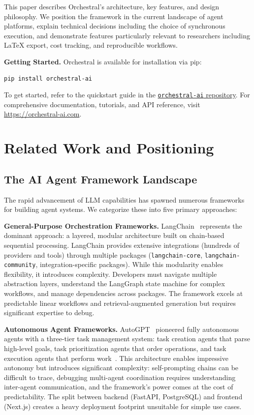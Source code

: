 \documentclass{article}
\begin{document}
This paper describes Orchestral's architecture, key features, and design philosophy. We position the framework in the current landscape of agent platforms, explain technical decisions including the choice of synchronous execution, and demonstrate features particularly relevant to researchers including LaTeX export, cost tracking, and reproducible workflows.

\textbf{Getting Started.} Orchestral is available for installation via pip:

\begin{verbatim}
pip install orchestral-ai
\end{verbatim}

To get started, refer to the quickstart guide in the \href{https://github.com/orchestralAI/orchestral-ai.git}{\texttt{orchestral-ai} repository}. For comprehensive documentation, tutorials, and API reference, visit \url{https://orchestral-ai.com}.

\section{Related Work and Positioning}

\subsection{The AI Agent Framework Landscape}

The rapid advancement of LLM capabilities has spawned numerous frameworks for building agent systems. We categorize these into five primary approaches:

\textbf{General-Purpose Orchestration Frameworks.} LangChain~\cite{langchain} represents the dominant approach: a layered, modular architecture built on chain-based sequential processing. LangChain provides extensive integrations (hundreds of providers and tools) through multiple packages (\texttt{langchain-core}, \texttt{langchain-community}, integration-specific packages). While this modularity enables flexibility, it introduces complexity. Developers must navigate multiple abstraction layers, understand the LangGraph state machine for complex workflows, and manage dependencies across packages. The framework excels at predictable linear workflows and retrieval-augmented generation but requires significant expertise to debug.

\textbf{Autonomous Agent Frameworks.} AutoGPT~\cite{autogpt} pioneered fully autonomous agents with a three-tier task management system: task creation agents that parse high-level goals, task prioritization agents that order operations, and task execution agents that perform work~\cite{autogpt-arch}. This architecture enables impressive autonomy but introduces significant complexity: self-prompting chains can be difficult to trace, debugging multi-agent coordination requires understanding inter-agent communication, and the framework's power comes at the cost of predictability. The split between backend (FastAPI, PostgreSQL) and frontend (Next.js) creates a heavy deployment footprint unsuitable for simple use cases.
\end{document}
